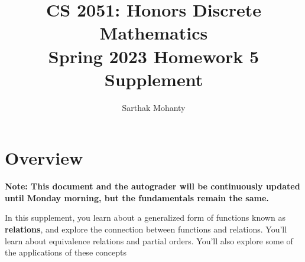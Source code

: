 \documentclass{article}
\title{\vspace{-1cm}CS 2051: Honors Discrete Mathematics \\Spring 2023 Homework 5 Supplement}
\author{Sarthak Mohanty }
\date{}
\begin{document}
\maketitle

\section*{Overview}
    \textbf{Note: This document and the autograder will be continuously updated until Monday morning, but the fundamentals remain the same.}




    

    \vspace{2mm}
    In this supplement, you learn about a generalized form of functions known as \textbf{relations}, and explore the connection between functions and relations. You'll learn about equivalence relations and partial orders. You'll also explore some of the applications of these concepts
\end{document}
